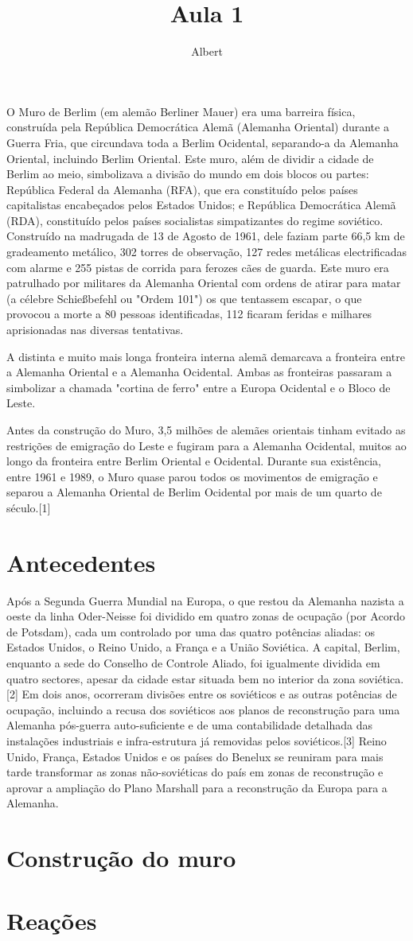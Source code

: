 \documentclass[a4paper]{article}
\author{Albert}
\title{Aula 1}
\begin{document}
\maketitle

O Muro de Berlim (em alemão Berliner Mauer) era uma barreira física, construída pela República Democrática Alemã (Alemanha Oriental) durante a Guerra Fria, que circundava toda a Berlim Ocidental, separando-a da Alemanha Oriental, incluindo Berlim Oriental. Este muro, além de dividir a cidade de Berlim ao meio, simbolizava a divisão do mundo em dois blocos ou partes: República Federal da Alemanha (RFA), que era constituído pelos países capitalistas encabeçados pelos Estados Unidos; e República Democrática Alemã (RDA), constituído pelos países socialistas simpatizantes do regime soviético. Construído na madrugada de 13 de Agosto de 1961, dele faziam parte 66,5 km de gradeamento metálico, 302 torres de observação, 127 redes metálicas electrificadas com alarme e 255 pistas de corrida para ferozes cães de guarda. Este muro era patrulhado por militares da Alemanha Oriental com ordens de atirar para matar (a célebre Schießbefehl ou "Ordem 101") os que tentassem escapar, o que provocou a morte a 80 pessoas identificadas, 112 ficaram feridas e milhares aprisionadas nas diversas tentativas.

A distinta e muito mais longa fronteira interna alemã demarcava a fronteira entre a Alemanha Oriental e a Alemanha Ocidental. Ambas as fronteiras passaram a simbolizar a chamada "cortina de ferro" entre a Europa Ocidental e o Bloco de Leste.

Antes da construção do Muro, 3,5 milhões de alemães orientais tinham evitado as restrições de emigração do Leste e fugiram para a Alemanha Ocidental, muitos ao longo da fronteira entre Berlim Oriental e Ocidental. Durante sua existência, entre 1961 e 1989, o Muro quase parou todos os movimentos de emigração e separou a Alemanha Oriental de Berlim Ocidental por mais de um quarto de século.[1]

\section*{Antecedentes}
Após a Segunda Guerra Mundial na Europa, o que restou da Alemanha nazista a oeste da linha Oder-Neisse foi dividido em quatro zonas de ocupação (por Acordo de Potsdam), cada um controlado por uma das quatro potências aliadas: os Estados Unidos, o Reino Unido, a França e a União Soviética. A capital, Berlim, enquanto a sede do Conselho de Controle Aliado, foi igualmente dividida em quatro sectores, apesar da cidade estar situada bem no interior da zona soviética.[2] Em dois anos, ocorreram divisões entre os soviéticos e as outras potências de ocupação, incluindo a recusa dos soviéticos aos planos de reconstrução para uma Alemanha pós-guerra auto-suficiente e de uma contabilidade detalhada das instalações industriais e infra-estrutura já removidas pelos soviéticos.[3] Reino Unido, França, Estados Unidos e os países do Benelux se reuniram para mais tarde transformar as zonas não-soviéticas do país em zonas de reconstrução e aprovar a ampliação do Plano Marshall para a reconstrução da Europa para a Alemanha.
\section*{Construção do muro}
\section*{Reações}
\end{document}
